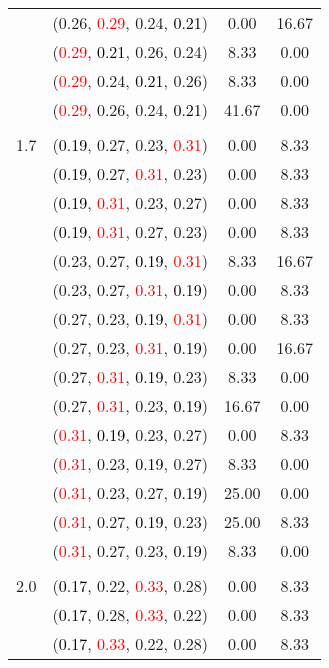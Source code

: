 \documentclass[10pt,a4paper]{report}
\begin{document}
\begin{center}
\begin{longtable}{clcc}
			&(0.26, \textcolor{red}{0.29}, 0.24, \textcolor{black}{0.21})&0.00&16.67\\
			&(\textcolor{red}{0.29}, \textcolor{black}{0.21}, 0.26, 0.24)&8.33&0.00\\
			&(\textcolor{red}{0.29}, 0.24, \textcolor{black}{0.21}, 0.26)&8.33&0.00\\
			&(\textcolor{red}{0.29}, 0.26, 0.24, \textcolor{black}{0.21})&41.67&0.00\\
		&&&\\
		1.7			&(\textcolor{black}{0.19}, 0.27, 0.23, \textcolor{red}{0.31})&0.00&8.33\\
			&(\textcolor{black}{0.19}, 0.27, \textcolor{red}{0.31}, 0.23)&0.00&8.33\\
			&(\textcolor{black}{0.19}, \textcolor{red}{0.31}, 0.23, 0.27)&0.00&8.33\\
			&(\textcolor{black}{0.19}, \textcolor{red}{0.31}, 0.27, 0.23)&0.00&8.33\\
			&(0.23, 0.27, \textcolor{black}{0.19}, \textcolor{red}{0.31})&8.33&16.67\\
			&(0.23, 0.27, \textcolor{red}{0.31}, \textcolor{black}{0.19})&0.00&8.33\\
			&(0.27, 0.23, \textcolor{black}{0.19}, \textcolor{red}{0.31})&0.00&8.33\\
			&(0.27, 0.23, \textcolor{red}{0.31}, \textcolor{black}{0.19})&0.00&16.67\\
			&(0.27, \textcolor{red}{0.31}, \textcolor{black}{0.19}, 0.23)&8.33&0.00\\
			&(0.27, \textcolor{red}{0.31}, 0.23, \textcolor{black}{0.19})&16.67&0.00\\
			&(\textcolor{red}{0.31}, \textcolor{black}{0.19}, 0.23, 0.27)&0.00&8.33\\
			&(\textcolor{red}{0.31}, 0.23, \textcolor{black}{0.19}, 0.27)&8.33&0.00\\
			&(\textcolor{red}{0.31}, 0.23, 0.27, \textcolor{black}{0.19})&25.00&0.00\\
			&(\textcolor{red}{0.31}, 0.27, \textcolor{black}{0.19}, 0.23)&25.00&8.33\\
			&(\textcolor{red}{0.31}, 0.27, 0.23, \textcolor{black}{0.19})&8.33&0.00\\
		&&&\\
		2.0			&(\textcolor{black}{0.17}, 0.22, \textcolor{red}{0.33}, 0.28)&0.00&8.33\\
			&(\textcolor{black}{0.17}, 0.28, \textcolor{red}{0.33}, 0.22)&0.00&8.33\\
			&(\textcolor{black}{0.17}, \textcolor{red}{0.33}, 0.22, 0.28)&0.00&8.33\\

\end{longtable}
\end{center}
\end{document}

